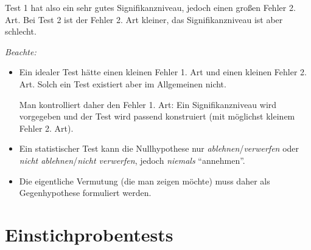Test 1 hat also ein sehr gutes Signifikanzniveau, jedoch einen großen Fehler
2. Art. Bei Test 2 ist der Fehler 2. Art kleiner, das Signifikanzniveau ist
aber schlecht.

\clearpage

\emph{Beachte:}
\begin{itemize}
\item Ein idealer Test hätte einen kleinen Fehler 1. Art und einen kleinen
  Fehler 2. Art. Solch ein Test existiert aber im Allgemeinen nicht.
  
  Man kontrolliert daher den Fehler 1. Art: Ein Signifikanzniveau wird
  vorgegeben und der Test wird passend konstruiert (mit möglichst kleinem
  Fehler 2. Art).
\item Ein statistischer Test kann die Nullhypothese nur
  \emph{ablehnen}/\emph{verwerfen} oder \emph{nicht ablehnen}/\emph{nicht
    verwerfen}, jedoch \emph{niemals} ``annehmen''.
\item Die eigentliche Vermutung (die man zeigen möchte) muss daher als
  Gegenhypothese formuliert werden.
\end{itemize}
  

\section{Einstichprobentests}
